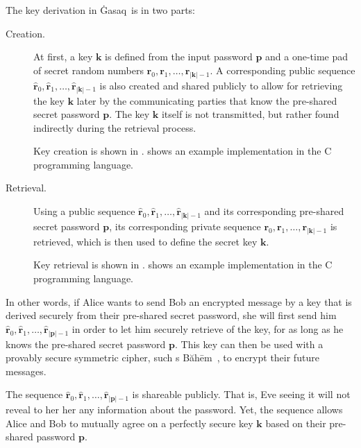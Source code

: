 \documentclass[twocolumn,hidelinks]{article}
\newcommand{\ghasaq}{Ġasaq}
\newcommand{\baheem}{Băhēm}
\begin{document}
The key derivation in \ghasaq\ is in two parts:
\begin{description}
    \item[Creation.]  At first, a key $\mathbf{k}$ is defined from the
        input password $\mathbf{p}$ and a one-time pad of secret random
        numbers $\mathbf{r}_0, \mathbf{r}_1, \ldots,
        \mathbf{r}_{|\mathbf{k}|-1}$. A corresponding public sequence
        $\mathbf{\hat r}_0, \mathbf{\hat r}_1, \ldots, \mathbf{\hat
        r}_{|\mathbf{k}|-1}$ is also created and shared publicly to allow
        for retrieving the key $\mathbf{k}$ later by the communicating
        parties that know the pre-shared secret password $\mathbf{p}$.
        The key $\mathbf{k}$ itself is not transmitted, but rather found
        indirectly during the retrieval process.

        Key creation is shown in .
         shows an example implementation in the C
        programming language.
    \item[Retrieval.]  Using a public sequence $\mathbf{\hat r}_0,
        \mathbf{\hat r}_1, \ldots, \mathbf{\hat r}_{|\mathbf{k}|-1}$ and
        its corresponding pre-shared secret password $\mathbf{p}$, its
        corresponding private sequence $\mathbf{r}_0, \mathbf{r}_1, \ldots,
        \mathbf{r}_{|\mathbf{k}|-1}$ is retrieved, which is then used to
        define the secret key $\mathbf{k}$.

        Key retrieval is shown in .
         shows an example implementation in the C
        programming language.
\end{description}

In other words, if Alice wants to send Bob an encrypted message by a key
that is derived securely from their pre-shared secret password, she will
first send him $\mathbf{\hat r}_0, \mathbf{\hat r}_1, \ldots, \mathbf{\hat
r}_{|\mathbf{p}|-1}$ in order to let him securely retrieve of the key, for
as long as he knows the pre-shared secret password $\mathbf{p}$. This key
can then be used with a provably secure symmetric cipher, such s \baheem\
\cite{baheem}, to encrypt their future messages.

The sequence $\mathbf{\hat r}_0, \mathbf{\hat r}_1, \ldots, \mathbf{\hat
r}_{|\mathbf{p}|-1}$ is shareable publicly.  That is, Eve seeing it will
not reveal to her her any information about the password. Yet, the sequence
allows Alice and Bob to mutually agree on a perfectly secure key
$\mathbf{k}$ based on their pre-shared password $\mathbf{p}$.
\end{document}
